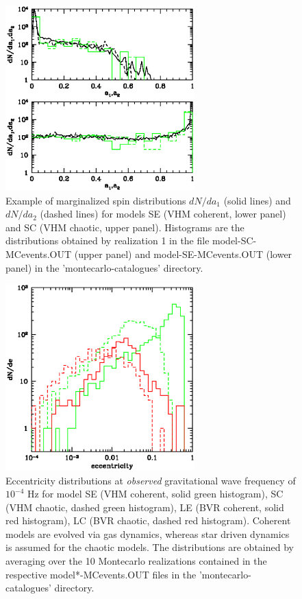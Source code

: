 \documentclass{iopart}
\begin{document}
\begin{figure}[H]
\center
   \includegraphics[width=0.65\textwidth]{FigSMBHModSel/FIG_EXAMPLE_SPINS.eps}
\caption{Example of marginalized spin distributions $dN/da_1$ (solid lines) and $dN/da_2$ (dashed lines) for models SE (VHM coherent, lower panel) and SC (VHM chaotic, upper panel). Histograms are the distributions obtained by realization 1 in the file model-SC-MCevents.OUT (upper panel) and model-SE-MCevents.OUT (lower panel) in the 'montecarlo-catalogues' directory.
\label{F:MBHbMod:fig2} } 
\end{figure}

\begin{figure}[H]
\center
   \includegraphics[width=0.65\textwidth]{FigSMBHModSel/FIG_EXAMPLE_ECCENTRICITY.eps}
\caption{Eccentricity distributions at {\it observed} gravitational wave frequency of $10^{-4}$ Hz for model SE (VHM coherent, solid green histogram), SC (VHM chaotic, dashed green histogram), LE (BVR coherent, solid red histogram), LC (BVR chaotic, dashed red histogram). Coherent models are evolved via gas dynamics, whereas star driven dynamics is assumed for the chaotic models. The distributions are obtained by averaging over the 10 Montecarlo realizations contained in the
respective model*-MCevents.OUT files in the 'montecarlo-catalogues' directory.
\label{F:MBHbMod:fig3} } 
\end{figure}
\end{document}
